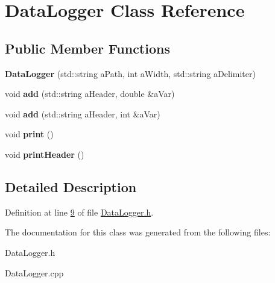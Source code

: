 \hypertarget{class_data_logger}{}\section{Data\+Logger Class Reference}
\label{class_data_logger}
\subsection*{Public Member Functions}
\begin{DoxyCompactItemize}
\item 
\mbox{\label{class_data_logger_aa95dc52c00e81fcb074ef4224d305238}} 
{\bfseries Data\+Logger} (std\+::string a\+Path, int a\+Width, std\+::string a\+Delimiter)
\item 
\mbox{\label{class_data_logger_a31d8ed8cfdda531f19236e214d5d931f}} 
void {\bfseries add} (std\+::string a\+Header, double \&a\+Var)
\item 
\mbox{\label{class_data_logger_a9af9879fe968dee468b3e479cadf073a}} 
void {\bfseries add} (std\+::string a\+Header, int \&a\+Var)
\item 
\mbox{\label{class_data_logger_aa1bd66fc07169787398f386d9276708b}} 
void {\bfseries print} ()
\item 
\mbox{\label{class_data_logger_ad7247b2350411b48f323de6c91e8479c}} 
void {\bfseries print\+Header} ()
\end{DoxyCompactItemize}


\subsection{Detailed Description}


Definition at line \hyperlink{_data_logger_8h_source_l00009}{9} of file \hyperlink{_data_logger_8h_source}{Data\+Logger.\+h}.



The documentation for this class was generated from the following files\+:\begin{DoxyCompactItemize}
\item 
Data\+Logger.\+h\item 
Data\+Logger.\+cpp\end{DoxyCompactItemize}
